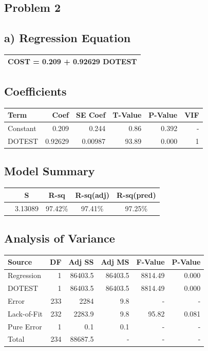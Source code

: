 \documentclass{article}
\begin{document}


\subsection*{Problem 2}
\subsection*{a) Regression Equation}
\begin{tabular}{c}
\toprule
COST = 0.209 + 0.92629 DOTEST \\
\bottomrule
\end{tabular}

\subsection*{Coefficients}
\begin{tabular}{lrrrrr}
\toprule
Term & Coef & SE Coef & T-Value & P-Value & VIF \\
\midrule
Constant & 0.209 & 0.244 & 0.86 & 0.392 & - \\
DOTEST & 0.92629 & 0.00987 & 93.89 & 0.000 & 1 \\
\bottomrule
\end{tabular}

\subsection*{Model Summary}
\begin{tabular}{lcccc}
\toprule
 & S & R-sq & R-sq(adj) & R-sq(pred) \\
\midrule
 & 3.13089 & 97.42\% & 97.41\% & 97.25\% \\
\bottomrule
\end{tabular}

\subsection*{Analysis of Variance}
\begin{tabular}{lrrrrr}
\toprule
Source & DF & Adj SS & Adj MS & F-Value & P-Value \\
\midrule
Regression & 1 & 86403.5 & 86403.5 & 8814.49 & 0.000 \\
DOTEST & 1 & 86403.5 & 86403.5 & 8814.49 & 0.000 \\
Error & 233 & 2284 & 9.8 & - & - \\
Lack-of-Fit & 232 & 2283.9 & 9.8 & 95.82 & 0.081 \\
Pure Error & 1 & 0.1 & 0.1 & - & - \\
Total & 234 & 88687.5 & - & - & - \\
\bottomrule
\end{tabular}
\end{document}
